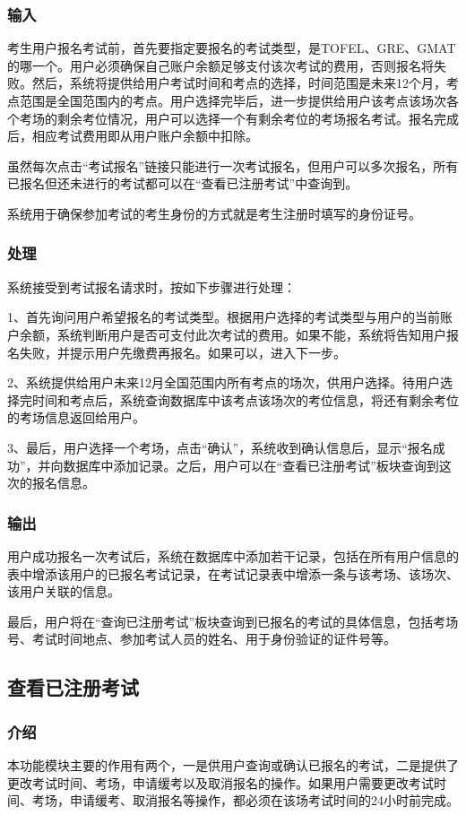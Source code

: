 \subsubsection{输入}
考生用户报名考试前，首先要指定要报名的考试类型，是TOFEL、GRE、GMAT的哪一个。用户必须确保自己账户余额足够支付该次考试的费用，否则报名将失败。然后，系统将提供给用户考试时间和考点的选择，时间范围是未来12个月，考点范围是全国范围内的考点。用户选择完毕后，进一步提供给用户该考点该场次各个考场的剩余考位情况，用户可以选择一个有剩余考位的考场报名考试。报名完成后，相应考试费用即从用户账户余额中扣除。

虽然每次点击“考试报名”链接只能进行一次考试报名，但用户可以多次报名，所有已报名但还未进行的考试都可以在“查看已注册考试”中查询到。

系统用于确保参加考试的考生身份的方式就是考生注册时填写的身份证号。

\subsubsection{处理}
系统接受到考试报名请求时，按如下步骤进行处理：

1、首先询问用户希望报名的考试类型。根据用户选择的考试类型与用户的当前账户余额，系统判断用户是否可支付此次考试的费用。如果不能，系统将告知用户报名失败，并提示用户先缴费再报名。如果可以，进入下一步。

2、系统提供给用户未来12月全国范围内所有考点的场次，供用户选择。待用户选择完时间和考点后，系统查询数据库中该考点该场次的考位信息，将还有剩余考位的考场信息返回给用户。

3、最后，用户选择一个考场，点击“确认”，系统收到确认信息后，显示“报名成功”，并向数据库中添加记录。之后，用户可以在“查看已注册考试”板块查询到这次的报名信息。

\subsubsection{输出}
用户成功报名一次考试后，系统在数据库中添加若干记录，包括在所有用户信息的表中增添该用户的已报名考试记录，在考试记录表中增添一条与该考场、该场次、该用户关联的信息。

最后，用户将在“查询已注册考试”板块查询到已报名的考试的具体信息，包括考场号、考试时间地点、参加考试人员的姓名、用于身份验证的证件号等。

\subsection{查看已注册考试}

\subsubsection{介绍}
本功能模块主要的作用有两个，一是供用户查询或确认已报名的考试，二是提供了更改考试时间、考场，申请缓考以及取消报名的操作。如果用户需要更改考试时间、考场，申请缓考、取消报名等操作，都必须在该场考试时间的24小时前完成。

